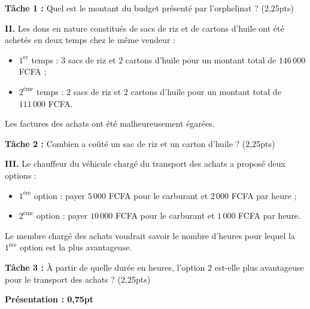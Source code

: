 \textbf{Tâche 1 :} Quel est le montant du budget présenté par l'orphelinat ? \hfill
(2,25pts)

\textbf{II.} Les dons en nature constitués de sacs de riz et de cartons d'huile ont été
achetés en deux temps chez le même vendeur :
\begin{itemize}
\item $1^{\text{er}}$ temps : $3$ sacs de riz et $2$ cartons d'huile pour un montant total
de $146\,000$ FCFA ;
\item $2^{\text{ème}}$ temps : $2$ sacs de riz et $2$ cartons d'huile pour un montant total
de $111\,000$ FCFA.
\end{itemize}
Les factures des achats ont été malheureusement égarées.

\textbf{Tâche 2 :} Combien a coûté un sac de riz et un carton d'huile ? \hfill (2,25pts)

\textbf{III.} Le chauffeur du véhicule chargé du transport des achats a proposé deux
options :
\begin{itemize}
\item $1^{\text{ère}}$ option : payer $5\,000$ FCFA pour le carburant et $2\,000$ FCFA par
heure ;
\item $2^{\text{ème}}$ option : payer $10\,000$ FCFA pour le carburant et $1\,000$ FCFA par
heure.
\end{itemize}
Le membre chargé des achats voudrait savoir le nombre d'heures pour lequel la
$1^{\text{ère}}$ option est la plus avantageuse.

\textbf{Tâche 3 :} À partir de quelle durée en heures, l'option $2$ est-elle plus
avantageuse pour le transport des achats ? \hfill (2,25pts)

\noindent\hfill\textbf{Présentation : 0,75pt}

